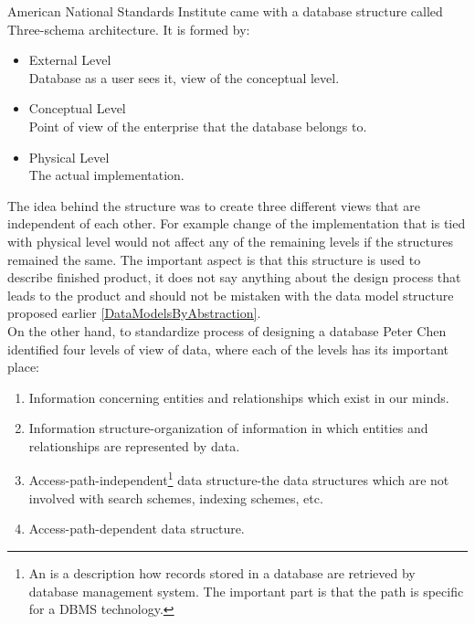 American National Standards Institute \cite{ANSIArchitecture75} came with a database structure called Three-schema architecture. It is formed by:
\begin{itemize}
	\item External Level \\ Database as a user sees it, view of the conceptual level. 
	\item Conceptual Level \\ Point of view of the enterprise that the database belongs to.
	\item Physical Level \\ The actual implementation.
\end{itemize}

The idea behind the structure was to create three different views that are independent of each other. 
For example change of the implementation that is tied with physical level would not affect any of the remaining levels if the structures remained the same. 
The important aspect is that this structure is used to describe finished product, it does not say anything about the design process that leads to the product and should not be mistaken with the data model structure proposed earlier \ref{DataModelsByAbstraction}.\\

On the other hand, to standardize process of designing a database Peter Chen\cite{Chen76theentity-relationship} identified four levels of view of data, where each of the levels has its important place: \\
\begin{enumerate}
	\item Information concerning entities and relationships which exist in our minds.
	\item Information structure-organization of information in which entities and relationships are represented by data.
	\item Access-path-independent\footnote{An  is a description how records stored in a database are retrieved by database management system\cite{AccessPathDefiniton}. The important part is that the path is specific for a DBMS technology.} data structure-the data structures which are not involved with search schemes, indexing schemes, etc.
	\item Access-path-dependent data structure.
\end{enumerate}

